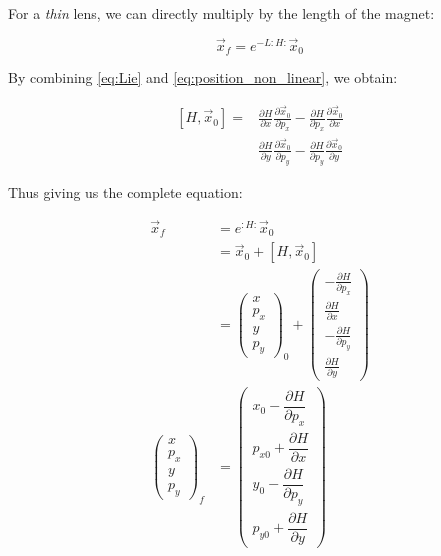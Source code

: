 \documentclass[12pt,a4,]{article}
\numberwithin{equation}{subsection}
\begin{document}
For a \emph{thin} lens, we can directly multiply by the length of the
magnet:

\begin{equation}\vec{x}_f = e^{-L:H:} \vec{x}_0\label{eq:position_non_linear_thin}\end{equation}

By combining \cref{eq:Lie} and \cref{eq:position_non_linear}, we obtain:

\begin{equation}
\begin{aligned}
\left[H, \vec{x}_0\right] =& \frac{\partial H}{\partial x} \frac{\partial \vec{x}_0}{\partial p_x} 
                                    -\frac{\partial H}{\partial p_x} \frac{\partial \vec{x}_0}{\partial x} \\
                           &\frac{\partial H}{\partial y} \frac{\partial \vec{x}_0}{\partial p_y} 
                                    -\frac{\partial H}{\partial p_y} \frac{\partial \vec{x}_0}{\partial y}
\end{aligned}
\label{eq:bracket_hamiltonian}\end{equation}

Thus giving us the complete equation:

\begin{equation}
\begin{aligned}
\vec{x}_f &= e^{:H:}\vec{x}_0 \\
          &= \vec{x}_0 + \left[H, \vec{x}_0\right] \\
          &= \begin{pmatrix} x \\ p_x \\ y \\ p_y\end{pmatrix}_0
             + \begin{pmatrix} -\frac{\partial H}{\partial p_x} \\ 
                               \frac{\partial H}{\partial x} \\
                               -\frac{\partial H}{\partial p_y} \\
                               \frac{\partial H}{\partial y}
               \end{pmatrix} \\
\begin{pmatrix} x \\ 
                p_{x} \\
                y \\
                p_{y} 
\end{pmatrix}_f
          &=  \begin{pmatrix} x_0 - \dfrac{\partial H}{\partial p_x} \\ 
                               p_{x0} +\dfrac{\partial H}{\partial x} \\
                               y_0 - \dfrac{\partial H}{\partial p_y} \\
                               p_{y0} +\dfrac{\partial H}{\partial y}
               \end{pmatrix}
\end{aligned}
\label{eq:non_linear_map}\end{equation}
\end{document}
